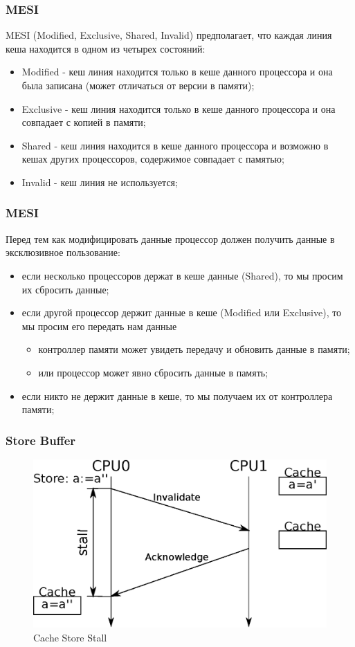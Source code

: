\begin{frame}
\frametitle{MESI}
MESI (Modified, Exclusive, Shared, Invalid) предполагает, что каждая линия кеша
находится в одном из четырех состояний:
\begin{itemize}
  \item Modified - кеш линия находится только в кеше данного процессора и она
        была записана (может отличаться от версии в памяти);
  \item Exclusive - кеш линия находится только в кеше данного процессора и она
        совпадает с копией в памяти;
  \item Shared - кеш линия находится в кеше данного процессора и возможно в
        кешах других процессоров, содержимое совпадает с памятью;
  \item Invalid - кеш линия не используется;
\end{itemize}
\end{frame}

\begin{frame}
\frametitle{MESI}
Перед тем как модифицировать данные процессор должен получить данные в
эксклюзивное пользование:
\begin{itemize}
  \item если несколько процессоров держат в кеше данные (Shared), то мы просим
        их сбросить данные;
  \item если другой процессор держит данные в кеше (Modified или Exclusive), то
        мы просим его передать нам данные
        \begin{itemize}
          \item контроллер памяти может увидеть передачу и обновить данные в
                памяти;
          \item или процессор может явно сбросить данные в память;
        \end{itemize}
  \item если никто не держит данные в кеше, то мы получаем их от контроллера
        памяти;
\end{itemize}
\end{frame}

\begin{frame}
\frametitle{Store Buffer}

\begin{figure}
  \centering\includegraphics[width=.8\linewidth]{cache-store-stall}
  \caption{Cache Store Stall}
\end{figure}
\end{frame}

